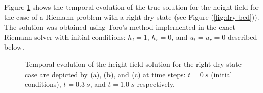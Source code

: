 \documentclass[10pt,a4paper]{article}
\newcommand{\Fig}[1]{Figure (\ref{fig:#1})}
\begin{document}
	Figure \ref{right}  shows the temporal evolution of the true solution  for the height field for the case of a Riemann problem with a right dry state (see  \Fig{dry-bed}). The solution was obtained using Toro's method implemented in the exact Riemann solver with initial conditions: $h_l  = 1$, $h_r = 0$, and  $u_l = u_r = 0$ described  below.
	\begin{figure}[H]
		\hfill
		\caption{Temporal evolution of the height field solution for the right dry state case  are depicted by (a), (b), and (c) at time steps: $t=0~s$ (initial conditions), $t = 0.3~s$, and $t = 1.0~s$ respectively. }
		\label{right}
	\end{figure}
	
\end{document}
